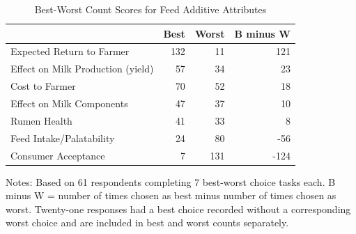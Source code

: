 \begin{table}[!h]
\centering
\caption{\label{tab:bwscores}Best-Worst Count Scores for Feed Additive Attributes}
\vspace{-8pt}
\centering
\begin{threeparttable}
\begin{tabular}[t]{lrrr}
\toprule
  & Best & Worst & B minus W\\
\midrule
Expected Return to Farmer & 132 & 11 & 121\\
Effect on Milk Production (yield) & 57 & 34 & 23\\
Cost to Farmer & 70 & 52 & 18\\
Effect on Milk Components & 47 & 37 & 10\\
Rumen Health & 41 & 33 & 8\\
\addlinespace
Feed Intake/Palatability & 24 & 80 & -56\\
Consumer Acceptance & 7 & 131 & -124\\
\bottomrule
\end{tabular}
\begin{tablenotes}
\item Notes: Based on 61 respondents completing 7 best-worst choice tasks each. B minus W = number of times chosen as best minus number of times chosen as worst. Twenty-one responses had a best choice recorded without a corresponding worst choice and are included in best and worst counts separately.
\end{tablenotes}
\end{threeparttable}
\end{table}
